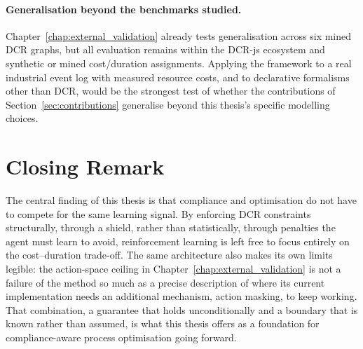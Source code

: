 \paragraph{Generalisation beyond the benchmarks studied.} Chapter~\ref{chap:external_validation} already tests generalisation across six mined \ac{DCR} graphs, but all evaluation remains within the DCR-js ecosystem and synthetic or mined cost/duration assignments. Applying the framework to a real industrial event log with measured resource costs, and to declarative formalisms other than \ac{DCR}, would be the strongest test of whether the contributions of Section~\ref{sec:contributions} generalise beyond this thesis's specific modelling choices.


\section{Closing Remark}
\label{sec:closing_remark}

The central finding of this thesis is that compliance and optimisation do not have to compete for the same learning signal. By enforcing \ac{DCR} constraints structurally, through a shield, rather than statistically, through penalties the agent must learn to avoid, reinforcement learning is left free to focus entirely on the cost--duration trade-off. The same architecture also makes its own limits legible: the action-space ceiling in Chapter~\ref{chap:external_validation} is not a failure of the method so much as a precise description of where its current implementation needs an additional mechanism, action masking, to keep working. That combination, a guarantee that holds unconditionally and a boundary that is known rather than assumed, is what this thesis offers as a foundation for compliance-aware process optimisation going forward.

